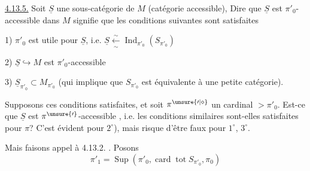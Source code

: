 
\uline{4.13.5.} Soit $\underline S$ une sous-catégorie 
de $M$ (catégorie accessible), 
Dire que $\underline S$ est $\pi'_0$-accessible dans $M$ signifie que
les conditions suivantes sont satisfaites

1) $\pi'_0$ est utile pour $\underline S$, i.e. $\underline S \overset{\sim}{\underset{\sim}{\leftarrow}}\operatorname{Ind}_{\pi'_0}(S_{\pi'_0})$\unsure{;}

2) $\underline S\hookrightarrow M$ est $\pi'_0$-accessible

3) $\underline S_{\pi'_0}\subset M_{\pi'_0}$ (qui implique que $S_{\pi'_0}$ est
équivalente à une petite catégorie).

 Supposons ces conditions satisfaites,
et soit $\pi^{\unsure{\prime|\diamond}}$ un cardinal $>\pi'_0$. Est-ce que
$\underline S$ est $\pi^{\unsure{\prime}}$-accessible , i.e. les conditions
similaires sont-elles satisfaites pour $\pi$?
C'est évident pour $2^\circ$), mais risque d'être
faux pour $1^\circ$, $3^\circ$.

 Mais faisons appel à
4.13.2. .  Posons
\[
\pi'_1=\operatorname{Sup}(\pi'_0,\operatorname{card}\operatorname{tot} S_{\pi'_0},\pi_0)
\]
